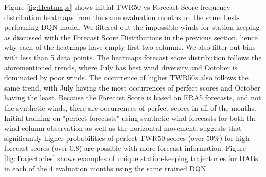 Figure \ref{fig:Heatmaps} shows initial TWR50 vs Forecast Score frequency distribution heatmaps from the same evaluation months on the same best-performing DQN model.  We filtered out the impossible winds for station keeping as discussed with the Forecast Score Distributions in the previous section, hence why each of the heatmaps have empty first two columns. We also filter out bins with less than 5 data points. The heatmaps forecast score distribution follows the aforementioned trends, where July has best wind diversity and October is dominated by poor winds. The occurrence of higher TWR50s also follows the same trend, with July having the most occurrences of perfect scores and October having the least. Because the Forecast Score is based on ERA5 forecasts, and not the synthetic winds, there are occurrences of perfect scores in all of the months.  Initial training on "perfect forecasts" using synthetic wind forecasts for both the wind column observation as well as the horizontal movement, suggests that significantly higher probabilities of perfect TWR50 scores (over 50\%) for high forecast scores (over 0.8) are possible with more forecast information. Figure \ref{fig:Trajectories} shows examples of unique station-keeping trajectories for HABs in each of the 4 evaluation months using the same trained DQN.  




